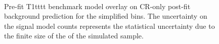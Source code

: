 \begin{figure}[h!]
    \begin{center}
         \\
        \caption{
            Pre-fit T1tttt benchmark model overlay on CR-only post-fit
            background prediction for the simplified bins. The uncertainty on
            the signal model counts represents the statistical uncertainty due
            to the finite size of the of the simulated sample.
        }
        \label{fig:T1tttt_MR_simp}
    \end{center}
\end{figure}

